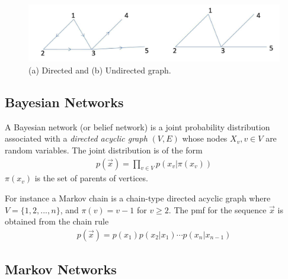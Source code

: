\documentclass[11pt,a4paper]{article}
\begin{document}
\begin{center}\begin{figure}[htbp]
    \centering
    \includegraphics[scale=0.25]{graph.png}
    \caption{(a) Directed and (b) Undirected graph.}
    \label{}
\end{figure}\end{center}

\subsection{Bayesian Networks}
A Bayesian network (or belief network) is a joint probability distribution associated with a \textit{directed acyclic graph} $(V,E)$ whose nodes $X_v, v \in V$ are random variables. The joint distribution is of the form
\begin{equation}
    \begin{aligned}
        p(\vec{x})=\prod_{v\in V}p(x_v|\pi(x_v))
    \end{aligned}
    \nonumber
\end{equation}
$\pi(x_v)$ is the set of parents of vertices.

For instance a Markov chain is a chain-type directed acyclic graph where $V = \{1, 2,..., n\}$, and $\pi(v) = v - 1$ for $v \geq 2$. The pmf for the sequence $\vec{x}$ is obtained from the chain rule
\begin{equation}
    \begin{aligned}
        p(\vec{x})=p(x_1)p(x_2|x_1)\cdots p(x_n|x_{n-1})
    \end{aligned}
    \nonumber
\end{equation}

\subsection{Markov Networks}
\end{document}
